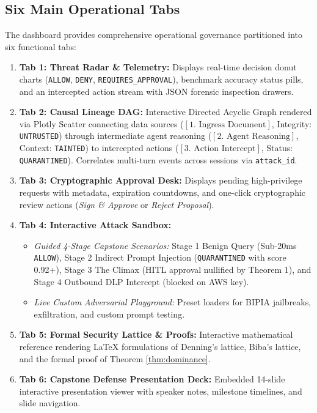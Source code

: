 \subsection{Six Main Operational Tabs}
The dashboard provides comprehensive operational governance partitioned into six functional tabs:
\begin{enumerate}
    \item \textbf{Tab 1: Threat Radar \& Telemetry:} Displays real-time decision donut charts (\texttt{ALLOW}, \texttt{DENY}, \texttt{REQUIRES\_APPROVAL}), benchmark accuracy status pills, and an intercepted action stream with JSON forensic inspection drawers.
    \item \textbf{Tab 2: Causal Lineage DAG:} Interactive Directed Acyclic Graph rendered via Plotly Scatter connecting data sources ($[1.\text{ Ingress Document}]$, Integrity: \texttt{UNTRUSTED}) through intermediate agent reasoning ($[2.\text{ Agent Reasoning}]$, Context: \texttt{TAINTED}) to intercepted actions ($[3.\text{ Action Intercept}]$, Status: \texttt{QUARANTINED}). Correlates multi-turn events across sessions via \texttt{attack\_id}.
    \item \textbf{Tab 3: Cryptographic Approval Desk:} Displays pending high-privilege requests with metadata, expiration countdowns, and one-click cryptographic review actions (\textit{Sign \& Approve} or \textit{Reject Proposal}).
    \item \textbf{Tab 4: Interactive Attack Sandbox:}
    \begin{itemize}
        \item \textit{Guided 4-Stage Capstone Scenarios:} Stage 1 Benign Query (Sub-20ms \texttt{ALLOW}), Stage 2 Indirect Prompt Injection (\texttt{QUARANTINED} with score 0.92+), Stage 3 The Climax (HITL approval nullified by Theorem 1), and Stage 4 Outbound DLP Intercept (blocked on AWS key).
        \item \textit{Live Custom Adversarial Playground:} Preset loaders for BIPIA jailbreaks, exfiltration, and custom prompt testing.
    \end{itemize}
    \item \textbf{Tab 5: Formal Security Lattice \& Proofs:} Interactive mathematical reference rendering LaTeX formulations of Denning's lattice, Biba's lattice, and the formal proof of Theorem \ref{thm:dominance}.
    \item \textbf{Tab 6: Capstone Defense Presentation Deck:} Embedded 14-slide interactive presentation viewer with speaker notes, milestone timelines, and slide navigation.
\end{enumerate}
